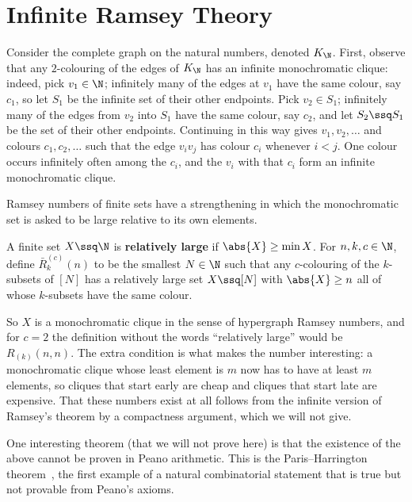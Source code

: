 \section{Infinite Ramsey Theory}

Consider the complete graph on the natural numbers, denoted $K_{\N}$. First, observe that any $2$-colouring of the edges of $K_{\N}$ has an infinite monochromatic clique: indeed, pick $v_1 \in \N$; infinitely many of the edges at $v_1$ have the same colour, say $c_1$, so let $S_1$ be the infinite set of their other endpoints. Pick $v_2 \in S_1$; infinitely many of the edges from $v_2$ into $S_1$ have the same colour, say $c_2$, and let $S_2 \ssq S_1$ be the set of their other endpoints. Continuing in this way gives $v_1, v_2, \ldots$ and colours $c_1, c_2, \ldots$ such that the edge $v_i v_j$ has colour $c_i$ whenever $i < j$. One colour occurs infinitely often among the $c_i$, and the $v_i$ with that $c_i$ form an infinite monochromatic clique.

Ramsey numbers of finite sets have a strengthening in which the monochromatic set is asked to be large relative to its own elements.

\begin{boxdefinition}
    A finite set $X \ssq \N$ is \textbf{relatively large} if $\abs{X} \geq \min X$. For $n, k, c \in \N$, define $\bar{R}^{(c)}_k(n)$ to be the smallest $N \in \N$ such that any $c$-colouring of the $k$-subsets of $[N]$ has a relatively large set $X \ssq [N]$ with $\abs{X} \geq n$ all of whose $k$-subsets have the same colour.
\end{boxdefinition}

So $X$ is a monochromatic clique in the sense of hypergraph Ramsey numbers, and for $c = 2$ the definition without the words ``relatively large'' would be $R_{(k)}(n, n)$. The extra condition is what makes the number interesting: a monochromatic clique whose least element is $m$ now has to have at least $m$ elements, so cliques that start early are cheap and cliques that start late are expensive. That these numbers exist at all follows from the infinite version of Ramsey's theorem by a compactness argument, which we will not give.

One interesting theorem (that we will not prove here) is that the existence of the above cannot be proven in Peano arithmetic. This is the Paris--Harrington theorem~\cite{ParisHarrington}, the first example of a natural combinatorial statement that is true but not provable from Peano's axioms.
